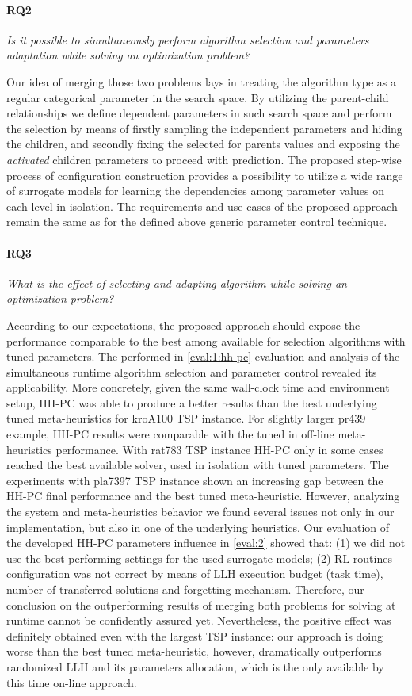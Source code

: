 \paragraph{RQ2} \emph{Is it possible to simultaneously perform algorithm selection and parameters adaptation while solving an optimization problem?}
	
Our idea of merging those two problems lays in treating the algorithm type as a regular categorical parameter in the search space. By utilizing the parent-child relationships we define dependent parameters in such search space and perform the selection by means of firstly sampling the independent parameters and hiding the children, and secondly fixing the selected for parents values and exposing the \emph{activated} children parameters to proceed with prediction. The proposed step-wise process  of configuration construction provides a possibility to utilize a wide range of surrogate models for learning the dependencies among parameter values on each level in isolation. The requirements and use-cases of the proposed approach remain the same as for the defined above generic parameter control technique.
	
\paragraph{RQ3} \emph{What is the effect of selecting and adapting algorithm while solving an optimization problem?}

According to our expectations, the proposed approach should expose the performance comparable to the best among available for selection algorithms with tuned parameters. The performed in \cref{eval:1:hh-pc} evaluation and analysis of the simultaneous runtime algorithm selection and parameter control revealed its applicability. More concretely, given the same wall-clock time and environment setup, HH-PC was able to produce a better results than the best underlying tuned meta-heuristics for kroA100 TSP instance. For slightly larger pr439 example, HH-PC results were comparable with the tuned in off-line meta-heuristics performance. With rat783 TSP instance HH-PC only in some cases reached the best available solver, used in isolation with tuned parameters. The experiments with pla7397 TSP instance shown an increasing gap between the HH-PC final performance and the best tuned meta-heuristic. However, analyzing the system and meta-heuristics behavior we found several issues not only in our implementation, but also in one of the underlying heuristics. Our evaluation of the developed HH-PC parameters influence in \cref{eval:2} showed that: (1) we did not use the best-performing settings for the used surrogate models; (2) RL routines configuration was not correct by means of LLH execution budget (task time), number of transferred solutions and forgetting mechanism. Therefore, our conclusion on the outperforming results of merging both problems for solving at runtime cannot be confidently assured yet. Nevertheless, the positive effect was definitely obtained even with the largest TSP instance: our approach is doing worse than the best tuned meta-heuristic, however, dramatically outperforms randomized LLH and its parameters allocation, which is the only available by this time on-line approach.

